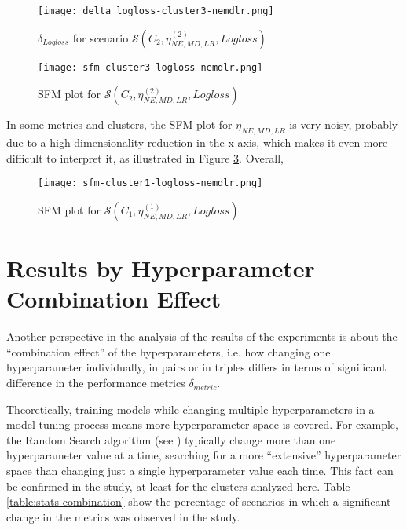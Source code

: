 \begin{figure}[H]
    \centering
    \texttt{[image: delta\_logloss-cluster3-nemdlr.png]}
    \caption{$\delta_{Logloss}$ for scenario $\mathcal{S}(C_2, \eta^{(2)}_{NE, MD, LR}, Logloss)$}
    \label{fig:delta-nemdlr-1}
\end{figure}

\begin{figure}[H]
    \centering
    \texttt{[image: sfm-cluster3-logloss-nemdlr.png]}
    \caption{SFM plot for $\mathcal{S}(C_2, \eta^{(2)}_{NE, MD, LR}, Logloss)$}
    \label{fig:sfm-nemdlr-1}
\end{figure}

In some metrics and clusters, the SFM plot for $\eta_{NE, MD, LR}$ is very noisy, probably due to a high dimensionality reduction in the x-axis, which makes it even more difficult to interpret it, as illustrated in Figure \ref{fig:sfm-nemdlr-2}. Overall, 

\begin{figure}[H]
    \centering
    \texttt{[image: sfm-cluster1-logloss-nemdlr.png]}
    \caption{SFM plot for $\mathcal{S}(C_1, \eta^{(1)}_{NE, MD, LR}, Logloss)$}
    \label{fig:sfm-nemdlr-2}
\end{figure}

\section{Results by Hyperparameter Combination Effect}

Another perspective in the analysis of the results of the experiments is about the ``combination effect'' of the hyperparameters, i.e. how changing one hyperparameter individually, in pairs or in triples differs in terms of significant difference in the performance metrics $\delta_{metric}$.

Theoretically, training models while changing multiple hyperparameters in a model tuning process means more hyperparameter space is covered. For example, the Random Search algorithm (see \cite{probst2018tunability}) typically change more than one hyperparameter value at a time, searching for a more ``extensive'' hyperparameter space than changing just a single hyperparameter value each time. This fact can be confirmed in the study, at least for the clusters analyzed here. Table \ref{table:stats-combination} show the percentage of scenarios in which a significant change in the metrics was observed in the study.

